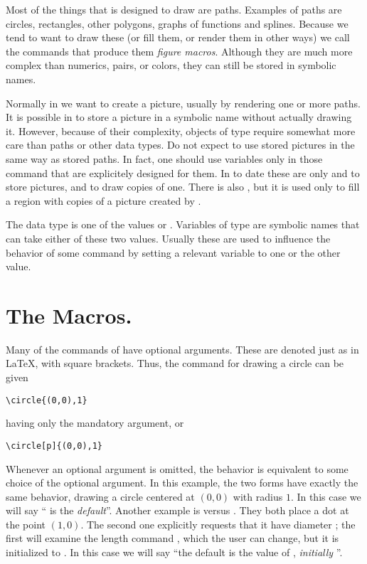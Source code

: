 \documentclass[letterpaper]{article}
\begin{document}
Most of the things that \mfp{} is designed to draw are paths. Examples
of paths are circles, rectangles,  other polygons, graphs of
functions and splines. Because we tend to want to draw these (or fill
them, or render them in other ways) we call the \mfp{} commands that
produce them \emph{figure macros}. Although they are much more complex
than numerics, pairs, or colors, they can still be stored in symbolic
names.

Normally in \mfp{} we want to create a picture, usually by rendering one
or more paths. It is possible in \MF{} to store a picture in a symbolic
name without actually drawing it. However, because of their complexity,
objects of type  require somewhat more care than paths or
other data types. Do not expect to use stored pictures in the same way
as stored paths. In fact, one should use  variables only in
those command that are explicitely designed for them. In \mfp{} to date
these are only  and  to store
pictures, and  to draw copies of one. There is also
, but it is used only to fill a region with copies of a picture
created by .

The  data type is one of the values  or
. Variables of type  are symbolic names that can
take either of these two values. Usually these are used to influence the
behavior of some command by setting a relevant  variable to
one or the other value.


\clearpage
\chapter{The Macros.}\label{macros}

Many of the commands of \mfp{} have optional arguments. These are
denoted just as in \LaTeX{}, with square brackets. Thus, the command for
drawing a circle can be given
\begin{verbatim}
\circle{(0,0),1}
\end{verbatim}
having only the mandatory argument, or
\begin{verbatim}
\circle[p]{(0,0),1}
\end{verbatim}
Whenever an optional argument is omitted, the behavior is equivalent to
some choice of the optional argument. In this example, the two forms
have exactly the same behavior, drawing a circle centered at $(0,0)$
with radius $1$. In this case we will say `` is the
\emph{default}''. Another example is  versus
\oarg{3pt}. They both place a dot at the point
$(1,0)$. The second one explicitly requests that it have diameter
\dim{3pt}; the first will examine the length command ,
which the user can change, but it is initialized to \dim{2pt}. In this
case we will say ``the default is the value of ,
\emph{initially} \dim{2pt}''.
\end{document}
